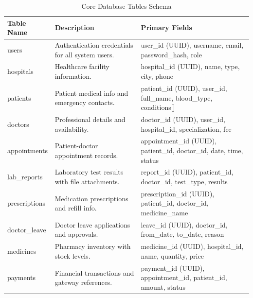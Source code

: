 \begin{table}[H]
    \small
    \centering
    \renewcommand{\arraystretch}{1.3}
    \begin{tabular}{|>{\raggedright\arraybackslash}p{2.6cm}|>{\raggedright\arraybackslash}p{6.3cm}|>{\raggedright\arraybackslash}p{4.7cm}|}
        \hline
        \textbf{Table Name} & \textbf{Description} & \textbf{Primary Fields} \\
        \hline
        users
            & Authentication credentials for all system users.
            & user\_id (UUID), username, email, password\_hash, role \\
        \hline
        hospitals
            & Healthcare facility information.
            & hospital\_id (UUID), name, type, city, phone \\
        \hline
        patients
            & Patient medical info and emergency contacts.
            & patient\_id (UUID), user\_id, full\_name, blood\_type, conditions[] \\
        \hline
        doctors
            & Professional details and availability.
            & doctor\_id (UUID), user\_id, hospital\_id, specialization, fee \\
        \hline
        appointments
            & Patient-doctor appointment records.
            & appointment\_id (UUID), patient\_id, doctor\_id, date, time, status \\
        \hline
        lab\_reports
            & Laboratory test results with file attachments.
            & report\_id (UUID), patient\_id, doctor\_id, test\_type, results \\
        \hline
        prescriptions
            & Medication prescriptions and refill info.
            & prescription\_id (UUID), patient\_id, doctor\_id, medicine\_name \\
        \hline
        doctor\_leave
            & Doctor leave applications and approvals.
            & leave\_id (UUID), doctor\_id, from\_date, to\_date, reason \\
        \hline
        medicines
            & Pharmacy inventory with stock levels.
            & medicine\_id (UUID), hospital\_id, name, quantity, price \\
        \hline
        payments
            & Financial transactions and gateway references.
            & payment\_id (UUID), appointment\_id, patient\_id, amount, status \\
        \hline
    \end{tabular}
    \caption{Core Database Tables Schema}
    \label{tab:database-schema}
\end{table}

